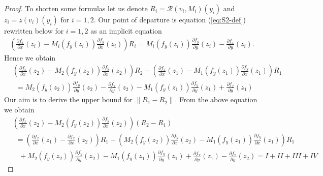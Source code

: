 \documentclass[11pt, leqno]{amsart}
\theoremstyle{definition}
\begin{document}
\begin{proof}
	To shorten some formulas let us denote $R_i=\mathcal{R}(v_i,M_i)(y_i)$ and   $z_i=z(v_i)(y_i)$ for $i=1,2$. Our point of departure is equation (\ref{eq:S2-def}) rewritten below
	for $i=1,2$ as an implicit equation
	\begin{eqnarray*}
		\left(\frac{\partial f_x}{\partial x}(z_i) -  M_i(f_y(z_i)) \frac{\partial f_y}{\partial x}(z_i) \right) R_i=
		M_i(f_y(z_i))\frac{\partial f_y}{\partial y}(z_i) -   \frac{\partial f_x}{\partial y}(z_i).
	\end{eqnarray*}
	Hence we obtain
	\begin{align*}
		& \left(\frac{\partial f_x}{\partial x}(z_2) -  M_2(f_y(z_2)) \frac{\partial f_y}{\partial x}(z_2) \right) R_2 - \left(\frac{\partial f_x}{\partial x}(z_1) -  M_1(f_y(z_1)) \frac{\partial f_y}{\partial x}(z_1) \right) R_1 \\
		&\ \ =  M_2(f_y(z_2))\frac{\partial f_y}{\partial y}(z_2) -   \frac{\partial f_x}{\partial y}(z_2) - M_1(f_y(z_1))\frac{\partial f_y}{\partial y}(z_1) +   \frac{\partial f_x}{\partial y}(z_1)
	\end{align*}
	Our aim is to derive the upper bound for $\|R_1-R_2\|$. From the above equation we obtain
	\begin{align} \label{eq:R2R1-estm}
		&\left(\frac{\partial f_x}{\partial x}(z_2) -  M_2(f_y(z_2)) \frac{\partial f_y}{\partial x}(z_2) \right) (R_2-R_1)  \\
	&\ \ 	 =  \left( \frac{\partial f_x}{\partial x}(z_1) -\frac{\partial f_x}{\partial x}(z_2)\right)R_1    +  \left(M_2(f_y(z_2)) \frac{\partial f_y}{\partial x}(z_2) -  M_1(f_y(z_1)) \frac{\partial f_y}{\partial x}(z_1)  \right) R_1 \nonumber \\
		&\ \ \ \ + M_2(f_y(z_2))\frac{\partial f_y}{\partial y}(z_2) - M_1(f_y(z_1))\frac{\partial f_y}{\partial y}(z_1) +   \frac{\partial f_x}{\partial y}(z_1)-   \frac{\partial f_x}{\partial y}(z_2) = I + II + III + IV \nonumber
	\end{align}
	

\end{proof}
\end{document}
